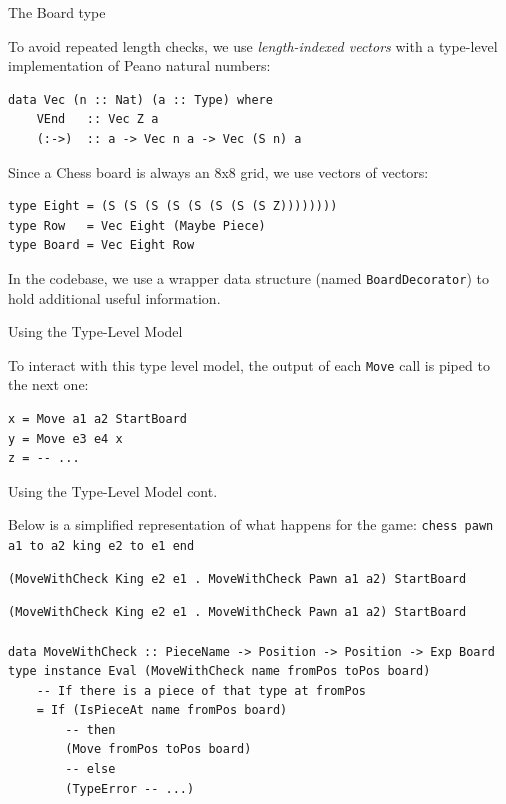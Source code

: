 \documentclass{beamer}
\newcommand{\inline}[1]{\lstinline[basicstyle=\ttfamily]{#1}}
\begin{document}
\begin{frame}[fragile]{The Board type}

To avoid repeated length checks, we use \emph{length-indexed vectors} with a type-level implementation of Peano natural numbers:

\begin{lstlisting}
data Vec (n :: Nat) (a :: Type) where
    VEnd   :: Vec Z a
    (:->)  :: a -> Vec n a -> Vec (S n) a
\end{lstlisting}

Since a Chess board is always an 8x8 grid, we use vectors of vectors:

\begin{lstlisting}
type Eight = (S (S (S (S (S (S (S (S Z))))))))
type Row   = Vec Eight (Maybe Piece)
type Board = Vec Eight Row
\end{lstlisting}

In the codebase, we use a wrapper data structure (named \inline{BoardDecorator}) to hold additional useful information.

\end{frame}

\begin{frame}[fragile]{Using the Type-Level Model}

To interact with this type level model, the output of each \inline{Move} call is piped to the next one:

\begin{lstlisting}
x = Move a1 a2 StartBoard
y = Move e3 e4 x
z = -- ...
\end{lstlisting}

\end{frame}

\begin{frame}[fragile]{Using the Type-Level Model cont.}

Below is a simplified representation of what happens for the game: \inline{chess pawn a1 to a2 king e2 to e1 end}

\begin{overprint}

\begin{lstlisting}
(MoveWithCheck King e2 e1 . MoveWithCheck Pawn a1 a2) StartBoard
\end{lstlisting}

\begin{lstlisting}
(MoveWithCheck King e2 e1 . MoveWithCheck Pawn a1 a2) StartBoard

data MoveWithCheck :: PieceName -> Position -> Position -> Exp Board
type instance Eval (MoveWithCheck name fromPos toPos board)
    -- If there is a piece of that type at fromPos
    = If (IsPieceAt name fromPos board)
        -- then
        (Move fromPos toPos board)
        -- else
        (TypeError -- ...)
\end{lstlisting}

\end{overprint}

\end{frame}
\end{document}

